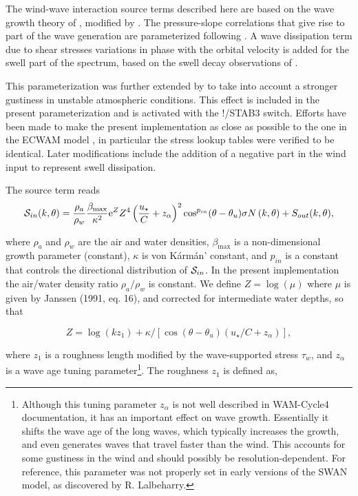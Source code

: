 The wind-wave interaction source terms described here are based on the wave growth
theory of \cite{art:Miles57}, modified by \cite{art:Jan82}. The pressure-slope
correlations that give rise to part of the wave generation are parameterized
following \cite{art:Jan91}. A wave dissipation term due to shear stresses
variations in phase with the orbital velocity is added for the swell part of
the spectrum, based on the swell decay observations of \cite{art:ACC08}.

This parameterization was further extended by \cite{rep:AB02} to take into
account a stronger gustiness in unstable atmospheric conditions. This effect is
included in the present parameterization and is activated with the {\code
!/STAB3} switch. Efforts have been made to make the present implementation as
close as possible to the one in the ECWAM model \citep{rep:Bea05}, in
particular the stress lookup tables were verified to be identical. 
Later modifications include the addition of a negative part in the wind input 
to represent swell dissipation.

The source term reads \citep{bk:Jan04}
\begin{equation}
{\cal S}_{in}(k,\theta) =
\frac{\rho_a}{\rho_w}\frac{\beta_{\mathrm{max}}}{\kappa^2}{\mathrm e}^{Z}Z^4
\left(\frac{u_\star}{C}+z_\alpha\right)^2 \cos^{p_{in}}(\theta - \theta_u) \sigma N
\left(k,\theta\right) + S_{out}(k,\theta),\label{eq:SinWAM4}
\end{equation}

\noindent where $\rho_a$ and $\rho_w$ are the air and water densities,
$\beta_{\mathrm{max}}$ is a non-dimensional growth parameter (constant),
$\kappa$ is von K\'{a}rm\'{a}n' constant, and $p_{in}$ is a constant that
controls the directional distribution of ${\cal S}_{in}$. In the present
implementation the air/water density ratio ${\rho_a}/{\rho_w}$ is constant. We
define $Z=\log(\mu)$ where $\mu$ is given by Janssen (1991, eq. 16), and
corrected for intermediate water depths, so that

\begin{equation}
Z=\log(k z_1)+\kappa/\left[\cos\left(\theta - \theta_u\right)
\left(u_\star/C + z_\alpha \right)\right],
\end{equation}

\noindent
where $z_1$ is a roughness length modified by the wave-supported stress
$\tau_w$, and $z_\alpha$ is a wave age tuning parameter\footnote{Although this
tuning parameter $z_\alpha$ is not well described in WAM-Cycle4 documentation,
it has an important effect on wave growth. Essentially it shifts the wave age
of the long waves, which typically increases the growth, and even generates
waves that travel faster than the wind. This accounts for some gustiness in
the wind and should possibly be resolution-dependent. For reference, this
parameter was not properly set in early versions of the SWAN model, as
discovered by R. Lalbeharry.}.  The roughness $z_1$ is defined as,

